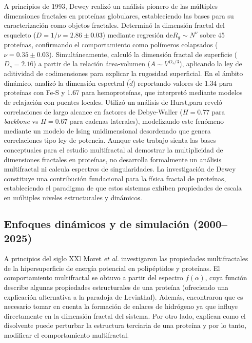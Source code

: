 A principios de 1993, Dewey \cite{Dewey1993} realizó un análisis pionero de las múltiples dimensiones fractales en proteínas globulares, estableciendo las bases para su caracterización como objetos fractales. Determinó la dimensión fractal del esqueleto ($D = 1/\nu = 2.86 \pm 0.03$) mediante regresión de$R_g \sim N^\nu$ sobre 45 proteínas, confirmando el comportamiento como polímeros colapsados ($\nu = 0.35 \pm 0.03$). Simultáneamente, calculó la dimensión fractal de superficie ($D_s = 2.16$) a partir de la relación área-volumen ($A \sim V^{D_s/3}$), aplicando la ley de aditividad de codimensiones para explicar la rugosidad superficial. En el ámbito dinámico, analizó la dimensión espectral ($\tilde{d}$) reportando valores de 1.34 para proteínas con Fe-S y 1.67 para hemoproteínas, que interpretó mediante modelos de relajación con puentes locales. Utilizó un análisis de Hurst,para reveló correlaciones de largo alcance en factores de Debye-Waller ($H = 0.77$ para \textit{backbone} vs $H = 0.67$ para cadenas laterales), modelizando este fenómeno mediante un modelo de Ising unidimensional desordenado que genera correlaciones tipo ley de potencia. Aunque este trabajo sienta las bases conceptuales para el estudio multifractal al demostrar la multiplicidad de dimensiones fractales en proteínas, no desarrolla formalmente un análisis multifractal ni calcula espectros de singularidades. La investigación de Dewey constituye una contribución fundacional para la física fractal de proteínas, estableciendo el paradigma de que estos sistemas exhiben propiedades de escala en múltiples niveles estructurales y dinámicos.


\subsection{Enfoques din\'{a}micos y de simulaci\'{o}n (2000--2025)}


A principios del siglo XXl Moret \textit{et al.}\cite{Moret2001} investigaron las propiedades multifractales de la hipersuperficie de energ\'{i}a potencial en polip\'{e}ptidos y prote\'{i}nas. El comportamiento multifractal se obtuvo a partir del espectro $f(\alpha)$, cuya funci\'{o}n describe algunas propiedades estructurales de una prote\'{i}na (ofreciendo una explicaci\'{o}n alternativa a la paradoja de Levinthal). Adem\'{a}s, encontraron que es necesario tomar en cuenta la formaci\'{o}n de enlaces de hidr\'{o}geno ya que influye directamente en la dimensi\'{o}n fractal del sistema. Por otro lado, explican como el disolvente puede perturbar la estructura terciaria de una prote\'{i}na y por lo tanto, modificar el comportamiento multifractal.

